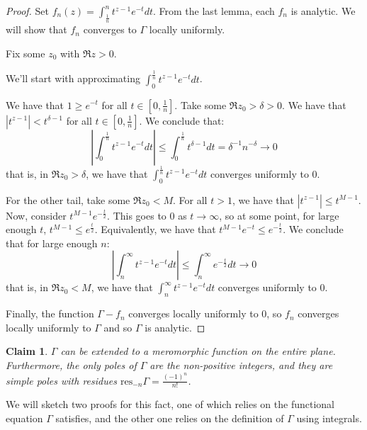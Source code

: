 \documentclass[11pt]{article} %
\newtheorem{claim}[theorem]{Claim}
\theoremstyle{definition}
\theoremstyle{remark}
\newcommand{\abs}[1]{\left|#1\right|}
\newcommand{\res}{\text{res}}
\begin{document}
\begin{proof}
Set $f_n\left(z\right) = \int_{\frac{1}{n}}^n t^{z-1}e^{-t}dt$. From the last lemma, each $f_n$ is analytic. We will show that $f_n$ converges to $\Gamma$ locally uniformly.

Fix some $z_0$ with $\Re z > 0$.

We'll start with approximating $\int_0^{\frac{1}{n}} t^{z-1} e^{-t} dt$.

We have that $1 \geq e^{-t}$ for all $t\in \left[0,\frac{1}{n}\right]$. Take some $\Re z_0 > \delta > 0$. We have that $\abs{t^{z-1}} < t^{\delta - 1}$ for all $t\in \left[0,\frac{1}{n}\right]$. We conclude that:
\[ \abs{\int_0^{\frac{1}{n}}t^{z-1} e^{-t} dt} \leq \int_0^{\frac{1}{n}} t^{\delta - 1} dt = \delta^{-1} n^{-\delta} \to 0\]
that is, in $\Re z_0 > \delta$, we have that $\int_0^{\frac{1}{n}}t^{z-1}e^{-t} dt$ converges uniformly to $0$.

For the other tail, take some $\Re z_0 < M$. For all $t > 1$, we have that $\abs{t^{z - 1}} \leq t^{M - 1}$. Now, consider $t^{M-1}e^{-\frac{t}{2}}$. This goes to $0$ as $t \to \infty$, so at some point, for large enough $t$, $t^{M-1} \leq e^{\frac{t}{2}}$. Equivalently, we have that $t^{M-1}e^{-t} \leq e^{-\frac{t}{2}}$. We conclude that for large enough $n$:
\[ \abs{\int _n ^\infty t^{z-1}e^{-t} dt} \leq \int_n ^\infty e^{-\frac{t}{2}}dt \to 0 \]
that is, in $\Re z_0 < M$, we have that $\int_n^\infty t^{z-1}e^{-t}dt$ converges uniformly to $0$.

Finally, the function $\Gamma - f_n$ converges locally uniformly to $0$, so $f_n$ converges locally uniformly to $\Gamma$ and so $\Gamma$ is analytic.
\end{proof}

\begin{claim}
$\Gamma$ can be extended to a meromorphic function on the entire plane. Furthermore, the only poles of $\Gamma$ are the non-positive integers, and they are simple poles with residues $\res_{-n} \Gamma = \frac{\left(-1\right)^n}{n!}$.
\end{claim}

We will sketch two proofs for this fact, one of which relies on the functional equation $\Gamma$ satisfies, and the other one relies on the definition of $\Gamma$ using integrals.
\end{document}
